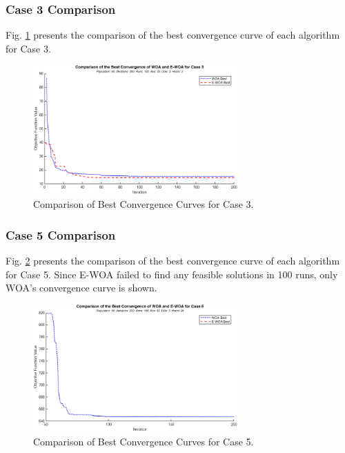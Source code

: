 \documentclass[12pt]{article}
\begin{document}
	\subsubsection{Case 3 Comparison}
	
	Fig. \ref{fig:case3convcomp} presents the comparison of the best convergence curve of each algorithm for Case 3.
	
	\begin{figure}[htbp]
		\centerline{\includegraphics[width=0.7\textwidth]{case3comp.png}}
		\caption{Comparison of Best Convergence Curves for Case 3.}
		\label{fig:case3convcomp}
	\end{figure}
	
	\subsubsection{Case 5 Comparison}
	
	Fig. \ref{fig:case5convcomp} presents the comparison of the best convergence curve of each algorithm for Case 5. Since E-WOA failed to find any feasible solutions in 100 runs, only WOA's convergence curve is shown.
	
	\begin{figure}[htbp]
		\centerline{\includegraphics[width=0.7\textwidth]{case5comp.png}}
		\caption{Comparison of Best Convergence Curves for Case 5.}
		\label{fig:case5convcomp}
	\end{figure}

	
\end{document}
